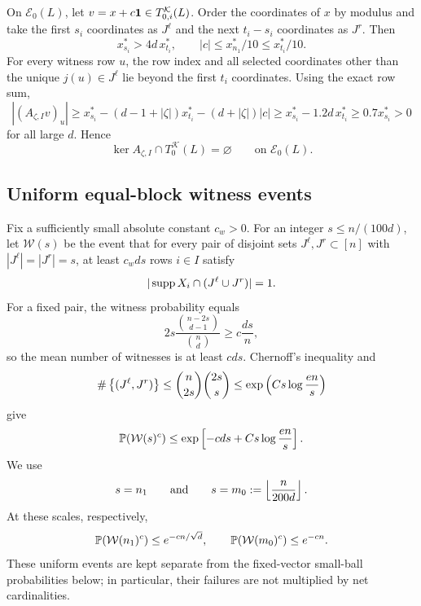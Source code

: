On $\mathcal E_0(L)$, let $v=x+c\mathbf 1\in T_{0,i}^{\mathcal K}(L)$. Order the coordinates of $x$ by modulus and take the first $s_i$ coordinates as $J^\ell$ and the next $t_i-s_i$ coordinates as $J^r$. Then
\begin{equation}\label{eq:T0-jump-shift}
  x_{s_i}^*>4d\,x_{t_i}^*,
  \qquad
  |c|\le x_{n_1}^*/10\le x_{t_i}^*/10.
\end{equation}
For every witness row $u$, the row index and all selected coordinates other than the unique $j(u)\in J^\ell$ lie beyond the first $t_i$ coordinates. Using the exact row sum,
\[
  |(A_{\zeta,I}v)_u|
  \ge x_{s_i}^*-(d-1+|\zeta|)x_{t_i}^*-(d+|\zeta|)|c|
  \ge x_{s_i}^*-1.2d\,x_{t_i}^*
  \ge0.7x_{s_i}^*>0
\]
for all large $d$. Hence
\begin{equation}\label{eq:T0-exclusion}
  \ker A_{\zeta,I}\cap T_0^{\mathcal K}(L)=\varnothing
  \qquad\text{on }\mathcal E_0(L).
\end{equation}

\subsection{Uniform equal-block witness events}

Fix a sufficiently small absolute constant $c_w>0$. For an integer $s\le n/(100d)$, let $\mathcal W(s)$ be the event that for every pair of disjoint sets $J^\ell,J^r\subset[n]$ with $|J^\ell|=|J^r|=s$, at least $c_wds$ rows $i\in I$ satisfy
\begin{equation}\label{eq:equal-block-witness}
  |\operatorname{supp} X_i\cap(J^\ell\cup J^r)|=1.
\end{equation}
For a fixed pair, the witness probability equals
\[
  2s\frac{\binom{n-2s}{d-1}}{\binom nd}\ge c\frac{ds}{n},
\]
so the mean number of witnesses is at least $cds$. Chernoff's inequality and
\[
  \#\left\{(J^\ell,J^r)\right\}
  \le\binom n{2s}\binom{2s}s
  \le\exp\left(Cs\log\frac{en}{s}\right)
\]
give
\begin{equation}\label{eq:W-s-failure}
  \mathbb P(\mathcal W(s)^c)
  \le\exp\left[-cds+Cs\log\frac{en}{s}\right].
\end{equation}
We use
\begin{equation}\label{eq:witness-scales}
  s=n_1
  \qquad\text{and}\qquad
  s=m_0:=\left\lfloor \frac n{200d}\right\rfloor.
\end{equation}
At these scales, respectively,
\begin{equation}\label{eq:witness-scale-failures}
  \mathbb P(\mathcal W(n_1)^c)\le e^{-cn/\sqrt d},
  \qquad
  \mathbb P(\mathcal W(m_0)^c)\le e^{-cn}.
\end{equation}
These uniform events are kept separate from the fixed-vector small-ball probabilities below; in particular, their failures are not multiplied by net cardinalities.

